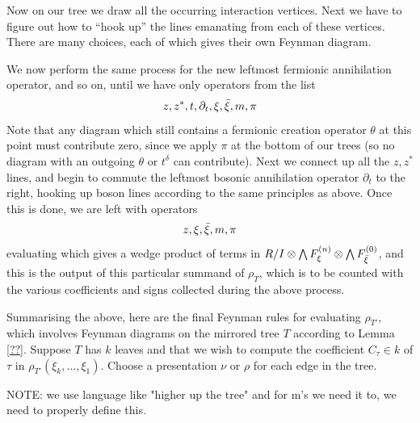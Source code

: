 \documentclass[english,letter paper,12pt,leqno]{article}
\theoremstyle{example}
\newtheorem{example}[theorem]{Example}
\newtheorem{remark}[theorem]{Remark}
\numberwithin{equation}{section}
\def\Hom{\operatorname{Hom}}
\def\be{\begin{equation}}
\def\ee{\end{equation}}
\begin{document}
Now on our tree we draw all the occurring interaction vertices. Next we have to figure out how to ``hook up'' the lines emanating from each of these vertices. There are many choices, each of which gives their own Feynman diagram.


We now perform the same process for the new leftmost fermionic annihilation operator, and so on, until we have only operators from the list
\be\label{eq:goodlist_3}
z, z^*, t, \partial_t, \xi, \Bar{\xi}, m, \pi
\ee
Note that any diagram which still contains a fermionic creation operator $\theta$ at this point must contribute zero, since we apply $\pi$ at the bottom of our trees (so no diagram with an outgoing $\theta$ or $t^\delta$ can contribute). Next we connect up all the $z,z^*$ lines, and begin to commute the leftmost bosonic annihilation operator $\partial_t$ to the right, hooking up boson lines according to the same principles as above. Once this is done, we are left with operators
\be\label{eq:goodlist_3}
z, \xi, \Bar{\xi}, m, \pi
\ee
evaluating which gives a wedge product of terms in $R/I \otimes \bigwedge F_\xi^{(n)} \otimes \bigwedge F_{\Bar{\xi}}^{(0)}$, and this is the output of this particular summand of $\rho_T$, which is to be counted with the various coefficients and signs collected during the above process.


Summarising the above, here are the final Feynman rules for evaluating $\rho_{T'}$, which involves Feynman diagrams on the mirrored tree $T$ according to Lemma \ref{??}. Suppose $T$ has $k$ leaves and that we wish to compute the coefficient $C_\tau \in k$ of $\tau$ in $\rho_{T'}( \xi_k, \ldots, \xi_1 )$. Choose a presentation $\nu$ or $\rho$ for each edge in the tree.

NOTE: we use language like "higher up the tree" and for m's we need it to, we need to properly define this.
\end{document}
